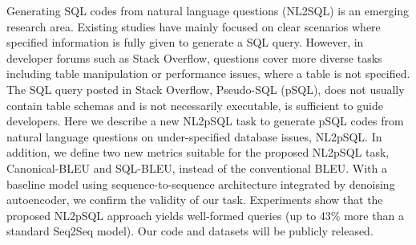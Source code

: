 Generating SQL codes from natural language questions (NL2SQL) is an emerging research area. Existing studies have mainly focused on clear scenarios where specified information is fully given to generate a SQL query. However, in developer forums such as Stack Overflow, questions cover more diverse tasks including table manipulation or performance issues, where a table is not specified. The SQL query posted in Stack Overflow, Pseudo-SQL (pSQL), does not usually contain table schemas and is not necessarily executable, is sufficient to guide developers.  Here we describe a new NL2pSQL task to generate pSQL codes from natural language questions on under-specified database issues, NL2pSQL. In addition, we define two new metrics suitable for the proposed NL2pSQL task, Canonical-BLEU and SQL-BLEU, instead of the conventional BLEU. With a baseline model using sequence-to-sequence architecture integrated by denoising autoencoder, we confirm the validity of our task. Experiments show that the proposed NL2pSQL approach yields well-formed queries (up to 43\% more than a standard Seq2Seq model). Our code and datasets will be publicly released.